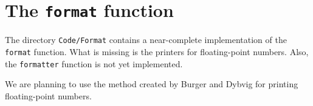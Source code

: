 \chapter{The \texttt{format} function}

The directory \texttt{Code/Format} contains a near-complete
implementation of the \texttt{format} function.  What is missing is
the printers for floating-point numbers.  Also, the \texttt{formatter}
function is not yet implemented.

We are planning to use the method created by Burger and Dybvig
for printing floating-point numbers. 
